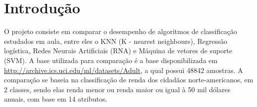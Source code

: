 \section{Introdução}
O projeto consiste em comparar o desempenho de algoritmos de classificação estudados em aula, entre eles o KNN (K - nearest neighbours), Regressão logística, Redes Neurais Artificiais (RNA) e Máquina de vetores de suporte (SVM). A base utilizada para comparação é a base disponibilizada em \url{http://archive.ics.uci.edu/ml/datasets/Adult}, a qual possui 48842 amostras. A comparação se baseia na classificação de renda dos cidadãos norte-americanos, em 2 classes, sendo elas renda menor ou renda maior ou igual à 50 mil dólares anuais, com base em 14 atributos.